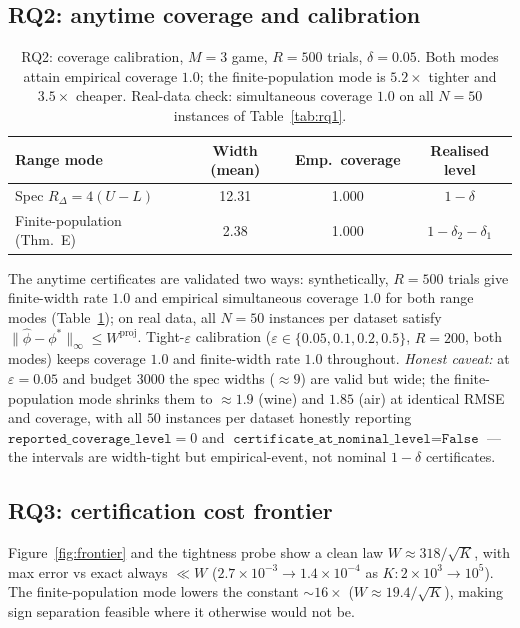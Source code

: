 \documentclass[preprint,12pt]{elsarticle}
\begin{document}
\subsection{RQ2: anytime coverage and calibration}\label{sec:rq2}

\begin{table}[htbp]\centering\small
\caption{RQ2: coverage calibration, $M{=}3$ game, $R{=}500$ trials, $\delta{=}0.05$. Both modes attain empirical coverage $1.0$; the finite-population mode is $5.2\times$ tighter and $3.5\times$ cheaper. Real-data check: simultaneous coverage $1.0$ on all $N=50$ instances of Table~\ref{tab:rq1}.}
\label{tab:rq2}
\begin{tabular}{lccc}
\toprule
Range mode & Width (mean) & Emp.\ coverage & Realised level \\
\midrule
Spec $R_\Delta{=}4(U{-}L)$ & 12.31 & 1.000 & $1-\delta$ \\
Finite-population (Thm.~E) & 2.38 & 1.000 & $1{-}\delta_2{-}\delta_1$ \\
\bottomrule
\end{tabular}
\end{table}

The anytime certificates are validated two ways: synthetically, $R=500$ trials give finite-width rate $1.0$ and empirical simultaneous coverage $1.0$ for both range modes (Table~\ref{tab:rq2}); on real data, all $N=50$ instances per dataset satisfy $\|\hat\phi-\phi^*\|_\infty\le W^{\mathrm{proj}}$. Tight-$\varepsilon$ calibration ($\varepsilon\in\{0.05,0.1,0.2,0.5\}$, $R=200$, both modes) keeps coverage $1.0$ and finite-width rate $1.0$ throughout. \emph{Honest caveat:} at $\varepsilon=0.05$ and budget $3000$ the spec widths ($\approx9$) are valid but wide; the finite-population mode shrinks them to $\approx1.9$ (wine) and $1.85$ (air) at identical RMSE and coverage, with all $50$ instances per dataset honestly reporting $\texttt{reported\_coverage\_level}=0$ and $\texttt{certificate\_at\_nominal\_level}=\texttt{False}$ --- the intervals are width-tight but empirical-event, not nominal $1-\delta$ certificates.

\subsection{RQ3: certification cost frontier}\label{sec:frontier}

Figure~\ref{fig:frontier} and the tightness probe show a clean law $W\approx318/\sqrt K$, with max error vs exact always $\ll W$ ($2.7\times10^{-3}\to1.4\times10^{-4}$ as $K:2\times10^3\to10^5$). The finite-population mode lowers the constant $\sim16\times$ ($W\approx19.4/\sqrt K$), making sign separation feasible where it otherwise would not be.
\end{document}
